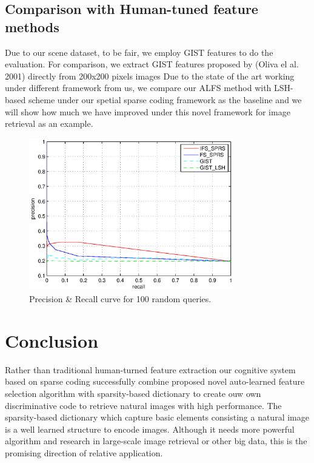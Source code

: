\documentclass[letterpaper]{article}
\begin{document}
\subsection{Comparison with Human-tuned feature methods}
Due to our scene dataset, to be fair, we employ GIST features to do the evaluation. For comparison, we extract GIST features proposed by (Oliva el al. 2001) directly from 200x200 pixels images 
Due to the state of the art working under different framework from us,  we compare our ALFS method with LSH-based scheme under our spetial sparse coding framework as the baseline and we will show how much we have improved under this novel framework for image retrieval as an example. 


\begin{figure}[ht]
	\centering
	\includegraphics[width=3.5in]{figures_dir/round4_random100_4comparison_75.eps}
	\caption{Precision \& Recall curve for 100 random queries.}
	\label{random 100 queries}
	
\end{figure}

\section{Conclusion}
Rather than traditional human-turned feature extraction our cognitive system based on sparse coding successfully combine proposed novel auto-learned feature selection algorithm with sparsity-based dictionary to create ouw own discriminative code to retrieve natural images with high performance. The sparsity-based dictionary which capture basic elements consisting a natural image is a well learned structure to encode images. Although it needs more powerful algorithm and research in large-scale image retrieval or other big data, this is the promising direction of relative application.  
\end{document}
